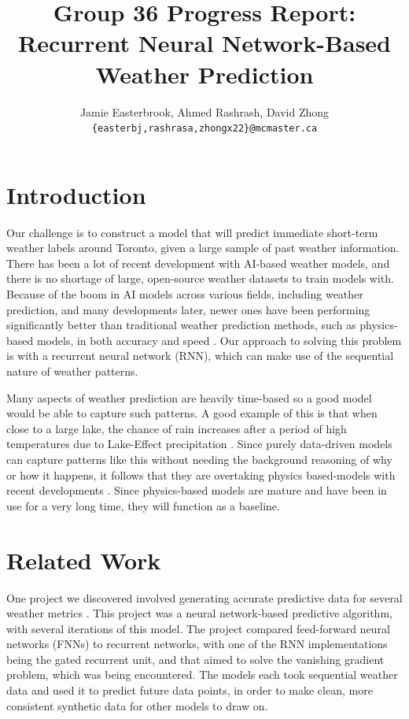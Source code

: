 \documentclass[11pt]{article}
\title{Group 36 Progress Report:\\Recurrent Neural Network-Based Weather Prediction}
\author{Jamie Easterbrook, Ahmed Rashrash, David Zhong \\
  \texttt{\{easterbj,rashrasa,zhongx22\}@mcmaster.ca} }
\begin{document}
\maketitle

\section{Introduction} %

Our challenge is to construct a model that will predict immediate short-term weather labels around Toronto, given a large sample of past weather information. There has been a lot of recent development with AI-based weather models, and there is no shortage of large, open-source weather datasets to train models with. Because of the boom in AI models across various fields, including weather prediction, and many developments later, newer ones have been performing significantly better than traditional weather prediction methods, such as physics-based models, in both accuracy and speed \citep{rackow2024robustnessaibasedweatherforecasts}. Our approach to solving this problem is with a recurrent neural network (RNN), which can make use of the sequential nature of weather patterns.

Many aspects of weather prediction are heavily time-based so a good model would be able to capture such patterns. A good example of this is that when close to a large lake, the chance of rain increases after a period of high temperatures due to Lake-Effect precipitation \citep{LakeEffectRainEvents}. Since purely data-driven models can capture patterns like this without needing the background reasoning of why or how it happens, it follows that they are overtaking physics based-models with recent developments \citep{rackow2024robustnessaibasedweatherforecasts}. Since physics-based models are mature and have been in use for a very long time, they will function as a baseline.

\section{Related Work} %

One project we discovered involved generating accurate predictive data for several weather metrics \citep{HAN2021107601}. This project was a neural network-based predictive algorithm, with several iterations of this model. The project compared feed-forward neural networks (FNNs) to recurrent networks, with one of the RNN implementations being the gated recurrent unit, and that aimed to solve the vanishing gradient problem, which was being encountered. The models each took sequential weather data and used it to predict future data points, in order to make clean, more consistent synthetic data for other models to draw on.
\end{document}
